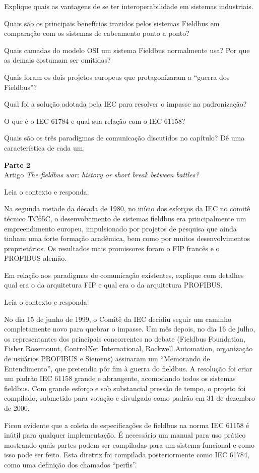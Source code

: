 \documentclass[11pt,a4paper]{article}
\newcommand{\parte}[3]{%
  \par\needspace{9\baselineskip}\vspace{1.2em}%
  \begin{tcolorbox}[enhanced, colback=Navy, colframe=Navy, arc=2pt,
    left=10pt, right=10pt, top=8pt, bottom=8pt, boxrule=0pt]
    {\color{AccentBright}\bfseries\Large Parte #1}\hspace{0.8em}{\color{white}\bfseries\Large #2}\\[2pt]
    {\color{white!75!Navy}\small #3}
  \end{tcolorbox}\vspace{0.3em}}
\newcommand{\q}[1]{\par\vspace{0.9em}\noindent{\color{Accent}\bfseries #1}\hspace{0.7em}}
\begin{document}
\q{1.5} Explique quais as vantagens de se ter interoperabilidade em sistemas industriais.

\q{1.6} Quais são os principais benefícios trazidos pelos sistemas Fieldbus em comparação com os sistemas de cabeamento ponto a ponto?

\q{1.7} Quais camadas do modelo OSI um sistema Fieldbus normalmente usa? Por que as demais costumam ser omitidas?

\q{1.8} Quais foram os dois projetos europeus que protagonizaram a “guerra dos Fieldbus”?

\q{1.9} Qual foi a solução adotada pela IEC para resolver o impasse na padronização?

\q{1.10} O que é o IEC 61784 e qual sua relação com o IEC 61158?

\q{1.11} Quais são os três paradigmas de comunicação discutidos no capítulo? Dê uma característica de cada um.

\parte{2}{A guerra dos Fieldbus}{Artigo \emph{The fieldbus war: history or short break between battles?}}

\q{2.1} Leia o contexto e responda.

\begin{apoio}[Contexto]
Na segunda metade da década de 1980, no início dos esforços da IEC no comitê técnico TC65C, o desenvolvimento de sistemas fieldbus era principalmente um empreendimento europeu, impulsionado por projetos de pesquisa que ainda tinham uma forte formação acadêmica, bem como por muitos desenvolvimentos proprietários. Os resultados mais promissores foram o FIP francês e o PROFIBUS alemão.
\end{apoio}

Em relação aos paradigmas de comunicação existentes, explique com detalhes qual era o da arquitetura FIP e qual era o da arquitetura PROFIBUS.

\q{2.2} Leia o contexto e responda.

\begin{apoio}[Contexto]
No dia 15 de junho de 1999, o Comitê da IEC decidiu seguir um caminho completamente novo para quebrar o impasse. Um mês depois, no dia 16 de julho, os representantes dos principais concorrentes no debate (Fieldbus Foundation, Fisher Rosemount, ControlNet International, Rockwell Automation, organização de usuários PROFIBUS e Siemens) assinaram um “Memorando de Entendimento”, que pretendia pôr fim à guerra do fieldbus. A resolução foi criar um padrão IEC 61158 grande e abrangente, acomodando todos os sistemas fieldbus. Com grande esforço e sob substancial pressão de tempo, o projeto foi compilado, submetido para votação e divulgado como padrão em 31 de dezembro de 2000.

Ficou evidente que a coleta de especificações de fieldbus na norma IEC 61158 é inútil para qualquer implementação. É necessário um manual para uso prático mostrando quais partes podem ser compiladas para um sistema funcional e como isso pode ser feito. Esta diretriz foi compilada posteriormente como IEC 61784, como uma definição dos chamados “perfis”.
\end{apoio}
\end{document}
